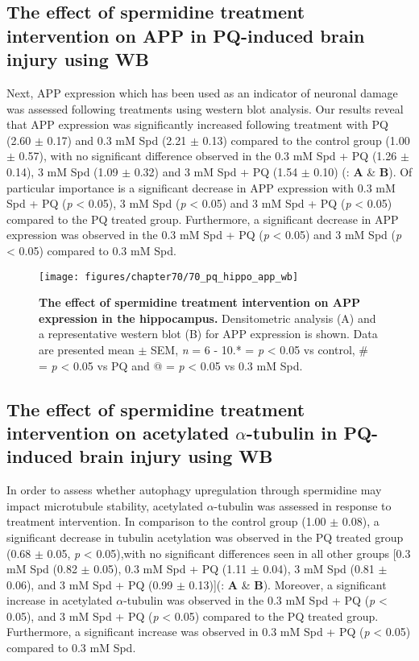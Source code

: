 \subsection{The effect of spermidine treatment intervention on APP in PQ-induced brain injury using WB}
Next, APP expression which has been used as an indicator of neuronal damage was assessed following treatments using western blot analysis. Our results reveal that APP expression was significantly increased following treatment with PQ (2.60 $\pm$ 0.17) and 0.3 mM Spd (2.21 $\pm$ 0.13) compared to the control group (1.00 $\pm$ 0.57), with no significant difference observed in the 0.3 mM Spd + PQ (1.26 $\pm$ 0.14), 3 mM Spd (1.09 $\pm$ 0.32) and 3 mM Spd + PQ (1.54 $\pm$ 0.10) (: \textbf{A} \& \textbf{B}). Of particular importance is a significant decrease in APP expression with 0.3 mM Spd + PQ (\textit{p} < 0.05), 3 mM Spd (\textit{p} < 0.05) and 3 mM Spd + PQ (\textit{p} < 0.05) compared to the PQ treated group. Furthermore, a significant decrease in APP expression was observed in the 0.3 mM Spd + PQ (\textit{p} < 0.05) and 3 mM Spd (\textit{p} < 0.05) compared to 0.3 mM Spd. 

\begin{figure}[!htbp]
\center
  \texttt{[image: figures/chapter70/70\_pq\_hippo\_app\_wb]}
  \caption[The effect of spermidine treatment intervention on APP expression in the hippocampus]{\textbf{The effect of spermidine treatment intervention on APP expression in the hippocampus.} Densitometric analysis (A) and a representative western blot (B) for APP expression is shown. Data are presented  mean $\pm$ SEM, \textit{n} = 6 - 10.* = \textit{p} < 0.05 vs control, \# = \textit{p} < 0.05 vs PQ and @ = \textit{p} < 0.05 vs 0.3 mM Spd.}
  \label{fig:70_pq_hippo_app_wb}
\end{figure} 

\subsection{The effect of spermidine treatment intervention on acetylated $\alpha$-tubulin in PQ-induced brain injury using WB}
In order to assess whether autophagy upregulation through spermidine may impact microtubule stability, acetylated $\alpha$-tubulin was assessed in response to treatment intervention. In comparison to the control group (1.00 $\pm$ 0.08), a significant decrease in tubulin acetylation was observed in the PQ treated group (0.68 $\pm$ 0.05, \textit{p} < 0.05),with no significant differences seen in all other groups [0.3 mM Spd (0.82 $\pm$ 0.05), 0.3 mM Spd + PQ (1.11 $\pm$ 0.04), 3 mM Spd (0.81 $\pm$ 0.06), and 3 mM Spd + PQ (0.99 $\pm$ 0.13)](: \textbf{A} \& \textbf{B}). Moreover, a significant increase in acetylated $\alpha$-tubulin was observed in the 0.3 mM Spd + PQ (\textit{p} < 0.05), and 3 mM Spd + PQ (\textit{p} < 0.05) compared to the PQ treated group. Furthermore, a significant increase was observed in 0.3 mM Spd + PQ (\textit{p} < 0.05) compared to 0.3 mM Spd.

